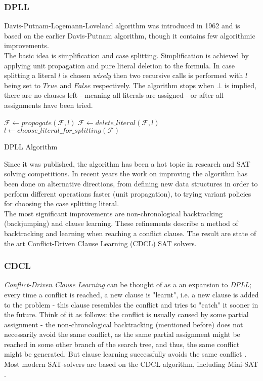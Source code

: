 \documentclass[]{article}
\begin{document}
	\subsubsection{DPLL}
	Davis-Putnam-Logemann-Loveland algorithm was introduced in 1962 and is based on the earlier Davis-Putnam algorithm, though it contains few algorithmic improvements. \\
	The basic idea is simplification and case splitting. Simplification is achieved by applying unit propagation and pure literal deletion to the formula. In case splitting a literal $ l $ is chosen \textit{wisely}\cite{BranchingH} then two recursive calls is performed with $ l $ being set to $ True $ and $ False $ respectively. The algorithm stops when $ \bot $ is implied, there are no clauses left - meaning all literals are assigned - or after all assignments have been tried.
	\\
	\begin{algorithm}[H]
		 {
			$ \mathcal{F} \leftarrow propogate(\mathcal{F}, l) $
		}
		 {
			$ \mathcal{F} \leftarrow delete\_literal(\mathcal{F}, l) $
		}
		$ l \leftarrow choose\_literal\_for\_splitting(\mathcal{F}) $ \\
	\caption{DPLL Algorithm}
	\end{algorithm}
	Since it was published, the algorithm has been a hot topic in research and SAT solving competitions. In recent years the work on improving the algorithm has been done on alternative directions, from defining new data structures in order to perform different operations faster (unit propagation), to trying variant policies for choosing the case splitting literal.\\ The most significant improvements are non-chronological backtracking (backjumping) and clause learning. These refinements describe a method of backtracking and learning when reaching a conflict clause. The result are state of the art Conflict-Driven Clause Learning (CDCL) SAT solvers.

	\subsubsection{CDCL}
	\textit{Conflict-Driven Clause Learning} can be thought of as a an expansion to \textit{DPLL}; every time a conflict is reached, a new clause is "learnt", i.e. a new clause is added to the problem - this clause resembles the conflict and tries to "catch" it sooner in the future. Think of it as follows: the conflict is usually caused by some partial assignment - the non-chronological backtracking (mentioned before) does not necessarily avoid the same conflict, as the same partial assignment might be reached in some other branch of the search tree, and thus, the same conflict might be generated. But clause learning successfully avoids the same conflict \cite{PracticalSatSolving}. Most modern SAT-solvers are based on the CDCL algorithm, including Mini-SAT \cite{MinisatDoc}.
	
\end{document}
